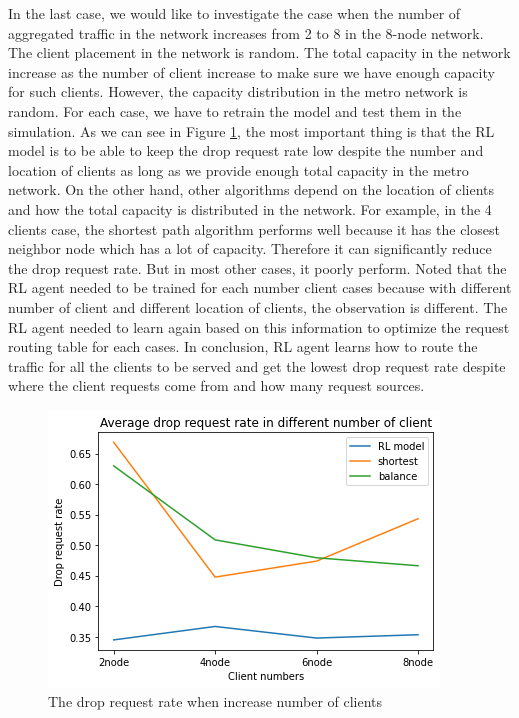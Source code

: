 \documentclass[conference]{IEEEtran}
\begin{document}
In the last case, we would like to investigate the case when the number of aggregated traffic in the network increases from 2 to 8 in the 8-node network. The client placement in the network is random. The total capacity in the network increase as the number of client increase to make sure we have enough capacity for such clients. However, the capacity distribution in the metro network is random. For each case, we have to retrain the model and test them in the simulation. As we can see in Figure \ref{fig:increase_ingress_clients}, the most important thing is that the RL model is to be able to keep the drop request rate low despite the number and location of clients as long as we provide enough total capacity in the metro network. On the other hand, other algorithms depend on the location of clients and how the total capacity is distributed in the network. For example, in the 4 clients case, the shortest path algorithm performs well because it has the closest neighbor node which has a lot of capacity. Therefore it can significantly reduce the drop request rate. But in most other cases, it poorly perform. Noted that the RL agent needed to be trained for each number client cases because with different number of client and different location of clients, the observation is different. The RL agent needed to learn again based on this information to optimize the request routing table for each cases. In conclusion, RL agent learns how to route the traffic for all the clients to be served and get the lowest drop request rate despite where the client requests come from and how many request sources.

\begin{figure}[]
    \centering
    \includegraphics[scale = 0.5]{imgs/increase_ingress_clients.png}
    \caption{The drop request rate when increase number of clients}
    \label{fig:increase_ingress_clients}
\end{figure}
\end{document}
